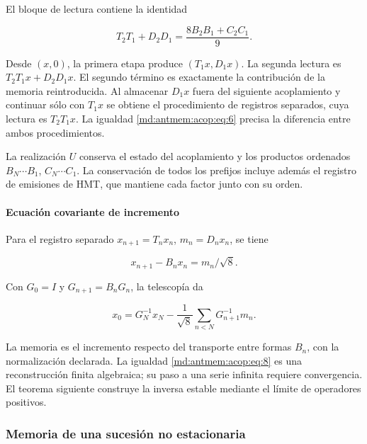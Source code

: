 El bloque de lectura contiene la identidad

\begin{equation}
\boxed{T_2T_1+D_2D_1=\frac{8B_2B_1+C_2C_1}{9}.}
\label{md:antmem:acop:eq:6}
\end{equation}

Desde \((x,0)\), la primera etapa produce \((T_1x,D_1x)\). La segunda lectura es \(T_2T_1x+D_2D_1x\). El segundo término es exactamente la contribución de la memoria reintroducida. Al almacenar \(D_1x\) fuera del siguiente acoplamiento y continuar sólo con \(T_1x\) se obtiene el procedimiento de registros separados, cuya lectura es \(T_2T_1x\). La igualdad \eqref{md:antmem:acop:eq:6} precisa la diferencia entre ambos procedimientos.

La realización \(U\) conserva el estado del acoplamiento y los productos ordenados \(B_N\cdots B_1\), \(C_N\cdots C_1\). La conservación de todos los prefijos incluye además el registro de emisiones de HMT, que mantiene cada factor junto con su orden.

\paragraph{Ecuación covariante de incremento}

Para el registro separado \(x_{n+1}=T_nx_n\), \(m_n=D_nx_n\), se tiene

\begin{equation}
x_{n+1}-B_nx_n=m_n/\sqrt8.
\label{md:antmem:acop:eq:7}
\end{equation}

Con \(G_0=I\) y \(G_{n+1}=B_nG_n\), la telescopía da

\begin{equation}
x_0=G_N^{-1}x_N-\frac1{\sqrt8}\sum_{n<N}G_{n+1}^{-1}m_n.
\label{md:antmem:acop:eq:8}
\end{equation}

La memoria es el incremento respecto del transporte entre formas \(B_n\), con la normalización declarada. La igualdad \eqref{md:antmem:acop:eq:8} es una reconstrucción finita algebraica; su paso a una serie infinita requiere convergencia. El teorema siguiente construye la inversa estable mediante el límite de operadores positivos.

\subsubsection{Memoria de una sucesión no estacionaria}

